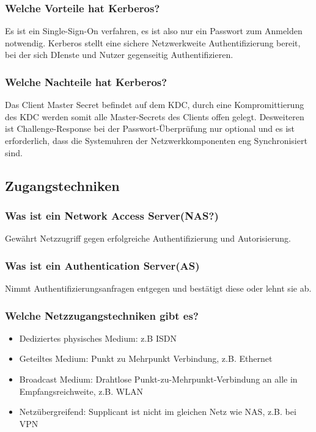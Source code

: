 	\subsubsection{Welche Vorteile hat Kerberos?}
	Es ist ein Single-Sign-On verfahren, es ist also nur ein Passwort zum Anmelden notwendig. Kerberos stellt eine sichere Netzwerkweite Authentifizierung  bereit, bei der sich DIenste und Nutzer gegenseitig Authentifizieren. 

	\subsubsection{Welche Nachteile hat Kerberos?}
	Das Client Master Secret befindet auf dem KDC, durch eine Kompromittierung des KDC werden somit alle Master-Secrets des Clients offen gelegt. Desweiteren ist Challenge-Response bei der Passwort-Überprüfung nur optional und es ist erforderlich, dass die Systemuhren der Netzwerkkomponenten eng Synchronisiert sind.
	
	
		
		\subsection{Zugangstechniken}
		
		\subsubsection{Was ist ein Network Access Server(NAS?)}
		Gewährt Netzzugriff gegen erfolgreiche Authentifizierung und Autorisierung.
		
		\subsubsection{Was ist ein Authentication Server(AS)}
		Nimmt Authentifizierungsanfragen entgegen und bestätigt diese oder lehnt sie ab.
		
		\subsubsection{Welche Netzzugangstechniken gibt es?}
		\begin{itemize}
			\item Dediziertes physisches Medium: z.B ISDN
			\item Geteiltes Medium: Punkt zu Mehrpunkt Verbindung, z.B. Ethernet
			\item Broadcast Medium: Drahtlose Punkt-zu-Mehrpunkt-Verbindung an alle in Empfangsreichweite, z.B. WLAN
			\item Netzübergreifend: Supplicant ist nicht im gleichen Netz wie NAS, z.B. bei VPN 
			
		\end{itemize}
